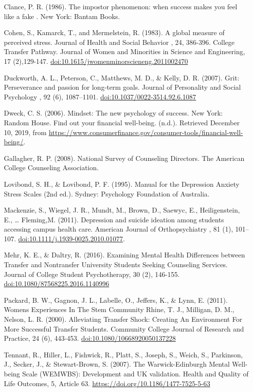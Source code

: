 \documentclass[]{book}
\begin{document}
Clance, P. R. (1986). The impostor phenomenon: when success makes you feel like a fake . New
York: Bantam Books.

Cohen, S., Kamarck, T., and Mermelstein, R. (1983). A global measure of perceived stress.
Journal of Health and Social Behavior , 24, 386-396.
College Transfer Pathway. Journal of Women and Minorities in Science and Engineering, 17 (2),129-147. \url{doi:10.1615/jwomenminorscieneng.2011002470}

Duckworth, A. L., Peterson, C., Matthews, M. D., \& Kelly, D. R. (2007). Grit: Perseverance and passion for long-term goals. Journal of Personality and Social Psychology , 92 (6),
1087--1101. \url{doi:10.1037/0022-3514.92.6.1087}

Dweck, C. S. (2006). Mindset: The new psychology of success. New York: Random House.
Find out your financial well-being. (n.d.). Retrieved December 10, 2019, from
\url{https://www.consumerfinance.gov/consumer-tools/financial-well-being/}.

Gallagher, R. P. (2008). National Survey of Counseling Directors. The American College
Counseling Association.

Lovibond, S. H., \& Lovibond, P. F. (1995). Manual for the Depression Anxiety Stress Scales
(2nd ed.). Sydney: Psychology Foundation of Australia.

Mackenzie, S., Wiegel, J. R., Mundt, M., Brown, D., Saewyc, E., Heiligenstein, E., \ldots{} Fleming,M. (2011). Depression and suicide ideation among students accessing campus health
care. American Journal of Orthopsychiatry , 81 (1), 101--107. \url{doi:10.1111/j.1939-0025.2010.01077}.

Mehr, K. E., \& Daltry, R. (2016). Examining Mental Health Differences between Transfer and
Nontransfer University Students Seeking Counseling Services. Journal of College
Student Psychotherapy, 30 (2), 146-155. \url{doi:10.1080/87568225.2016.1140996}

Packard, B. W., Gagnon, J. L., Labelle, O., Jeffers, K., \& Lynn, E. (2011). Womens Experiences In The Stem Community Rhine, T. J., Milligan, D. M., Nelson, L. R. (2000). Alleviating Transfer Shock: Creating An Environment For More Successful Transfer Students. Community College Journal of Research and Practice, 24 (6), 443-453. \url{doi:10.1080/10668920050137228}

Tennant, R., Hiller, L., Fishwick, R., Platt, S., Joseph, S., Weich, S., Parkinson, J., Secker, J., \& Stewart-Brown, S. (2007). The Warwick-Edinburgh Mental Well-being Scale
(WEMWBS): Development and UK validation. Health and Quality of Life Outcomes, 5,
Article 63. \url{https://doi.org/10.1186/1477-7525-5-63}
\end{document}
